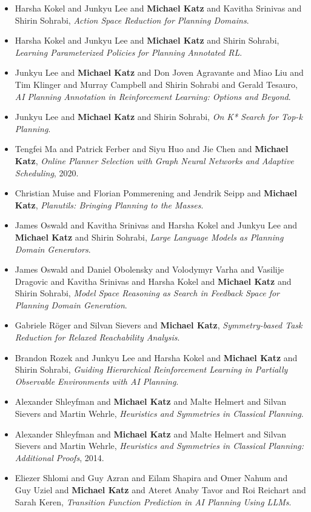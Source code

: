 \begin{itemize}[noitemsep]
\item Harsha Kokel and Junkyu Lee and {\bf Michael Katz} and Kavitha Srinivas and Shirin Sohrabi, {\it Action Space Reduction for Planning Domains}.
\item Harsha Kokel and Junkyu Lee and {\bf Michael Katz} and Shirin Sohrabi, {\it Learning Parameterized Policies for Planning Annotated RL}.
\item Junkyu Lee and {\bf Michael Katz} and Don Joven Agravante and Miao Liu and Tim Klinger and Murray Campbell and Shirin Sohrabi and Gerald Tesauro, {\it AI Planning Annotation in Reinforcement Learning: Options and Beyond}.
\item Junkyu Lee and {\bf Michael Katz} and Shirin Sohrabi, {\it On K* Search for Top-k Planning}.
\item Tengfei Ma and Patrick Ferber and Siyu Huo and Jie Chen and {\bf Michael Katz}, {\it Online Planner Selection with Graph Neural Networks and Adaptive Scheduling}, 2020.
\item Christian Muise and Florian Pommerening and Jendrik Seipp and {\bf Michael Katz}, {\it Planutils: Bringing Planning to the Masses}.
\item James Oswald and Kavitha Srinivas and Harsha Kokel and Junkyu Lee and {\bf Michael Katz} and Shirin Sohrabi, {\it Large Language Models as Planning Domain Generators}.
\item James Oswald and Daniel Obolensky and Volodymyr Varha and Vasilije Dragovic and Kavitha Srinivas and Harsha Kokel and {\bf Michael Katz} and Shirin Sohrabi, {\it Model Space Reasoning as Search in Feedback Space for Planning Domain Generation}.
\item Gabriele Röger and Silvan Sievers and {\bf Michael Katz}, {\it Symmetry-based Task Reduction for Relaxed Reachability Analysis}.
\item Brandon Rozek and Junkyu Lee and Harsha Kokel and {\bf Michael Katz} and Shirin Sohrabi, {\it Guiding Hierarchical Reinforcement Learning in Partially Observable Environments with AI Planning}.
\item Alexander Shleyfman and {\bf Michael Katz} and Malte Helmert and Silvan Sievers and Martin Wehrle, {\it Heuristics and Symmetries in Classical Planning}.
\item Alexander Shleyfman and {\bf Michael Katz} and Malte Helmert and Silvan Sievers and Martin Wehrle, {\it Heuristics and Symmetries in Classical Planning: Additional Proofs}, 2014.
\item Eliezer Shlomi and Guy Azran and Eilam Shapira and Omer Nahum and Guy Uziel and {\bf Michael Katz} and Ateret Anaby Tavor and Roi Reichart and Sarah Keren, {\it Transition Function Prediction in AI Planning Using LLMs}.

\end{itemize}
